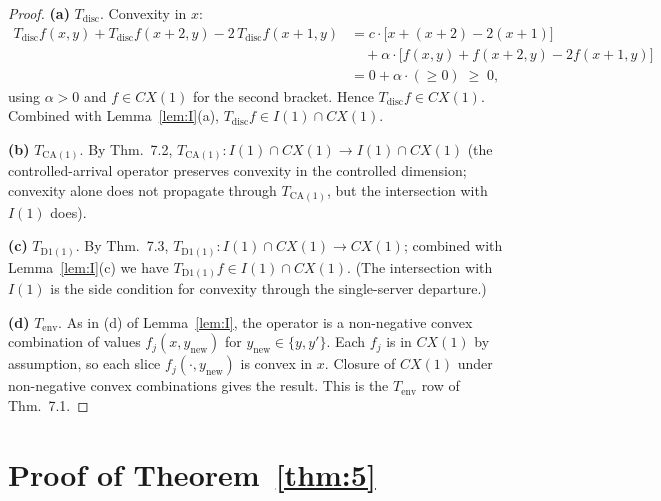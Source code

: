 \documentclass[11pt,a4paper]{article}
\newcommand{\Tdisc}{T_{\mathrm{disc}}}
\newcommand{\Tenv}{T_{\mathrm{env}}}
\newcommand{\Tca}{T_{\mathrm{CA}(1)}}
\newcommand{\Td}{T_{\mathrm{D1}(1)}}
\newcommand{\Cx}{CX}
\newcommand{\Iclass}{I}
\theoremstyle{definition}
\begin{document}
\begin{proof}
\textbf{(a)} $\Tdisc$. Convexity in $x$:
\begin{align*}
    \Tdisc f(x, y) + \Tdisc f(x + 2, y) - 2\, \Tdisc f(x + 1, y)
    &= c \cdot \bigl[x + (x + 2) - 2(x + 1)\bigr] \\
    &\quad + \alpha \cdot \bigl[f(x, y) + f(x + 2, y) - 2 f(x + 1, y)\bigr] \\
    &= 0 + \alpha \cdot (\ge 0) \;\ge\; 0,
\end{align*}
using $\alpha > 0$ and $f \in \Cx(1)$ for the second bracket. Hence
$\Tdisc f \in \Cx(1)$. Combined with Lemma~\ref{lem:I}(a), $\Tdisc f
\in \Iclass(1) \cap \Cx(1)$.

\textbf{(b)} $\Tca$. By Thm.~7.2, $\Tca : \Iclass(1) \cap \Cx(1)
\to \Iclass(1) \cap \Cx(1)$ (the controlled-arrival operator
preserves convexity in the controlled dimension; convexity alone
does not propagate through $\Tca$, but the intersection with $\Iclass(1)$
does).

\textbf{(c)} $\Td$. By Thm.~7.3, $\Td : \Iclass(1) \cap \Cx(1) \to
\Cx(1)$; combined with Lemma~\ref{lem:I}(c) we have $\Td f \in
\Iclass(1) \cap \Cx(1)$. (The intersection with $\Iclass(1)$ is the
side condition for convexity through the single-server departure.)

\textbf{(d)} $\Tenv$. As in (d) of Lemma~\ref{lem:I}, the operator
is a non-negative convex combination of values $f_j(x,
y_{\mathrm{new}})$ for $y_{\mathrm{new}} \in \{y, y'\}$. Each $f_j$
is in $\Cx(1)$ by assumption, so each slice $f_j(\cdot,
y_{\mathrm{new}})$ is convex in $x$. Closure of $\Cx(1)$ under
non-negative convex combinations gives the result. This is the
$\Tenv$ row of Thm.~7.1.
\end{proof}

\section{Proof of Theorem~\ref{thm:5}}
\label{sec:concl}
\end{document}
